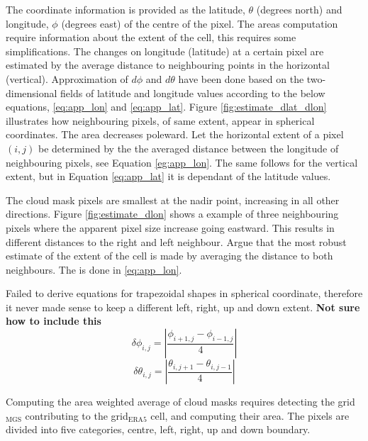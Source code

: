 The coordinate information is provided as the latitude, $\theta$ (degrees north) and longitude, $\phi$ (degrees east) of the centre of the pixel. The areas computation require information about the extent of the cell, this requires some simplifications. The changes on longitude (latitude) at a certain pixel are estimated by the average distance to neighbouring points in the horizontal (vertical). Approximation of $d\phi$ and $d\theta$ have been done based on the two-dimensional fields of latitude and longitude values according to the below equations, \eqref{eq:app_lon} and  \eqref{eq:app_lat}. Figure \ref{fig:estimate_dlat_dlon} illustrates how neighbouring pixels, of same extent, appear in spherical coordinates. The area decreases poleward. 
Let the horizontal extent of a pixel $(i,j)$ be determined by the the averaged distance between the longitude of neighbouring pixels, see Equation \eqref{eg:app_lon}. The same follows for the vertical extent, but in Equation \eqref{eq:app_lat} it is dependant of the latitude values. 

The cloud mask pixels are smallest at the nadir point, increasing in all other directions. Figure \ref{fig:estimate_dlon} shows a example of three neighbouring pixels where the apparent pixel size increase going eastward. This results in different distances to the right and left neighbour. Argue that the most robust estimate of the extent of the cell is made by averaging the distance to both neighbours. The is done in \eqref{eq:app_lon}. 

Failed to derive equations for trapezoidal shapes in spherical coordinate, therefore it never made sense to keep a different left, right, up and down extent. \textbf{Not sure how to include this}
\begin{equation} \label{eq:app_lon}
    \delta \phi_{i,j} = \left| \frac{\phi_{i+1,j} - \phi_{i-1, j}}{4} \right|
\end{equation}
\begin{equation} \label{eq:app_lat}
    \delta \theta_{i,j} = \left| \frac{\theta_{i,j+1} - \theta_{i, j-1}}{4} \right|
\end{equation}

Computing the area weighted average of cloud masks requires detecting the grid$_{\text{MGS}}$ contributing to the grid$_{\text{ERA5}}$ cell, and computing their area. The pixels are divided into five categories, centre, left, right, up and down boundary. 

